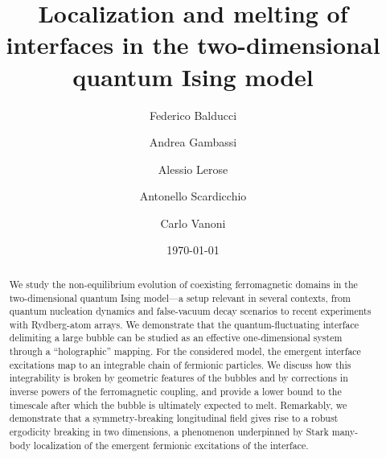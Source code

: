 \documentclass[reprint,aps,prl,superscriptaddress,english,nolongbibliography]{revtex4-2}
\begin{document}
\title{Localization and melting of interfaces in the two-dimensional quantum Ising model}

\author{Federico Balducci}
\author{Andrea Gambassi}
\author{Alessio Lerose}
\author{Antonello Scardicchio}
\author{Carlo Vanoni}


\date{\today}


\begin{abstract}
    We study the non-equilibrium evolution of coexisting ferromagnetic domains in the two-dimensional quantum Ising model---a setup relevant in several contexts, from quantum nucleation dynamics and false-vacuum decay scenarios to recent experiments with Rydberg-atom arrays. We demonstrate that the quantum-fluctuating interface delimiting a large bubble can be studied as an effective one-dimensional system through a ``holographic'' mapping. For the considered model, the emergent interface excitations map to an integrable chain of fermionic particles. We discuss how this integrability is broken by geometric features of the bubbles and by corrections in inverse powers of the ferromagnetic coupling, and provide a lower bound to the timescale after which the bubble is ultimately expected to melt. Remarkably, we demonstrate that a symmetry-breaking longitudinal field gives rise to a robust ergodicity breaking in two dimensions, a phenomenon underpinned by Stark many-body localization of the emergent fermionic excitations of the interface.
\end{abstract}


\maketitle
\end{document}
